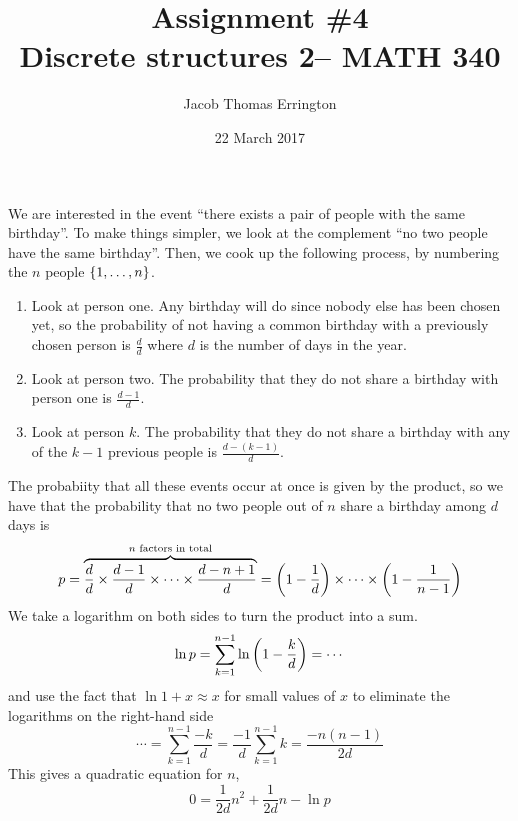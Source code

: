 \documentclass[11pt]{article}
\author{Jacob Thomas Errington}
\title{Assignment \#4\\Discrete structures 2-- MATH 340}
\date{22 March 2017}
\begin{document}
\maketitle


We are interested in the event ``there exists a pair of people with the same
birthday''.
To make things simpler, we look at the complement ``no two people have the same
birthday''.
Then, we cook up the following process, by numbering the $n$ people
$\left\{1,\ldots,n\right\}$.
%
\begin{enumerate}
    \item
        Look at person one. Any birthday will do since nobody else has been
        chosen yet, so the probability of not having a common birthday with a
        previously chosen person is $\frac{d}{d}$ where $d$ is the number of
        days in the year.
    \item
        Look at person two. The probability that they do not share a birthday
        with person one is $\frac{d-1}{d}$.
    \item Look at person $k$. The probability that they do not share a birthday
        with any of the $k-1$ previous people is $\frac{d-(k-1)}{d}$.
\end{enumerate}
%
The probabiity that all these events occur at once is given by the product, so
we have that the probability that no two people out of $n$ share a birthday
among $d$ days is
%
\begin{equation*}
    p
    = \overbrace{
        \frac{d}{d} \times
        \frac{d-1}{d} \times
        \cdots \times
        \frac{d-n+1}{d}
    }^{\text{$n$ factors in total}}
    = \left(1 - \frac{1}{d}\right)
        \times \cdots
        \times \left(1 - \frac{1}{n-1}\right)
\end{equation*}
%
We take a logarithm on both sides to turn the product into a sum.
%
\begin{equation*}
    \ln p
    = \sum_{k=1}^{n-1} {
        \ln{\left(1 - \frac{k}{d}\right)}
    }
    = \cdots
\end{equation*}
%
and use the fact that $\ln{1 + x} \approx x$ for small values of $x$ to
eliminate the logarithms on the right-hand side
%
\begin{equation*}
    \cdots
    = \sum_{k=1}^{n-1} {
        \frac{-k}{d}
    }
    = \frac{-1}{d} \sum_{k=1}^{n-1} k
    = \frac{-n(n-1)}{2d}
\end{equation*}
%
This gives a quadratic equation for $n$,
%
\begin{equation*}
    0 = \frac{1}{2d} n^2 + \frac{1}{2d} n - \ln p
\end{equation*}
\end{document}
